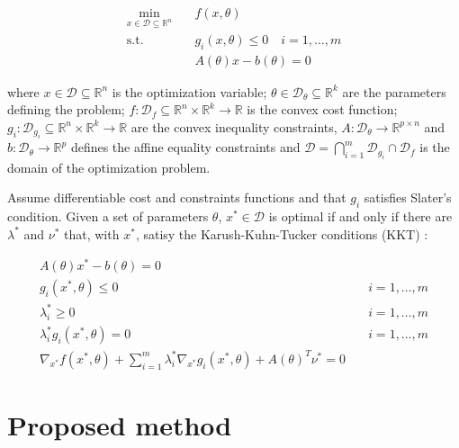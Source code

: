 \documentclass[
]{article}
\begin{document}
\[
\begin{aligned}
\min_{x \in \mathcal{D} \subseteq\mathbb{R}^n} \quad &f(x, {\theta})\\
\textrm{s.t.} \quad & g_i(x, \theta) \leq 0 \quad i = 1, \dots, m \\
& A(\theta) x - b(\theta) = 0
\end{aligned}
\]

where \(x \in \mathcal{D} \subseteq\mathbb{R}^n\) is the optimization
variable; \(\theta \in \mathcal{D}_\theta \subseteq \mathbb{R}^k\) are
the parameters defining the problem;
\(f: \mathcal{D}_f \subseteq\mathbb{R}^n \times \mathbb{R}^k \to \mathbb{R}\)
is the convex cost function;
\(g_i: \mathcal{D}_{g_i} \subseteq\mathbb{R}^n \times \mathbb{R}^k \to \mathbb{R}\)
are the convex inequality constraints,
\(A: \mathcal{D}_\theta \to \mathbb{R}^{p \times n}\) and
\(b: \mathcal{D}_\theta \to \mathbb{R}^{p}\) defines the affine equality
constraints and
\(\mathcal{D} = \bigcap_{i=1}^{m} \mathcal{D}_{g_i} \cap \mathcal{D}_{f}\)
is the domain of the optimization problem.

Assume differentiable cost and constraints functions and that \(g_i\)
satisfies Slater's condition. Given a set of parameters \(\theta\),
\(x^* \in \mathcal{D}\) is optimal if and only if there are
\(\lambda^*\) and \(\nu^*\) that, with \(x^*\), satisy the
Karush-Kuhn-Tucker conditions (KKT) \citep{boydConvexOptimization2004}:

\begin{align}
    A(\theta) x^* - b(\theta) = 0&\\
    g_i(x^*, \theta) \leq 0& \quad i=1,\dots, m\\
    \lambda_i^* \geq 0& \quad i=1,\dots, m\\
    \lambda_i^* g_i(x^*, \theta) = 0& \quad i=1,\dots, m\\
    \nabla_{x^*} f(x^*, \theta) + \sum\nolimits_{i=1}^m \lambda^*_i\nabla_{x^*} g_i(x^*, \theta) + A(\theta)^T\nu^* = 0 &
\end{align}

\section{Proposed method}\label{proposed-method}
\end{document}
